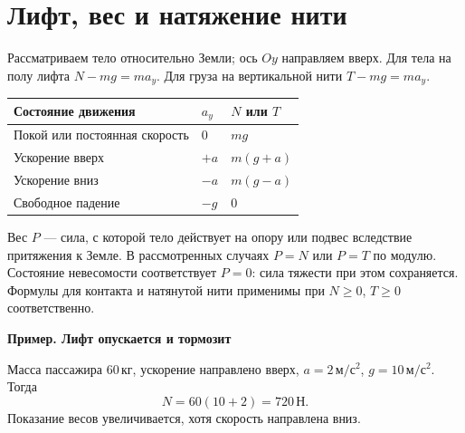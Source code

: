 \documentclass[a4paper,12pt]{article}
\newcommand{\unit}[1]{\,\text{#1}}
\newcommand{\acc}{\unit{м/с$^2$}}
\newcommand{\N}{\unit{Н}}
\newcommand{\kg}{\unit{кг}}
\newcommand{\example}[1]{\par\medskip\textbf{\textcolor{darkaccent}{#1}}\par}
\begin{document}
\section{Лифт, вес и натяжение нити}
Рассматриваем тело относительно Земли; ось $Oy$ направляем вверх. Для тела на полу лифта $N-mg=ma_y$. Для груза на вертикальной нити $T-mg=ma_y$.
\begin{center}
\end{center}
\begin{tabularx}{\linewidth}{@{}Xll@{}}\toprule
Состояние движения & $a_y$ & $N$ или $T$ \\\midrule
Покой или постоянная скорость & $0$ & $mg$\\
Ускорение вверх & $+a$ & $m(g+a)$\\
Ускорение вниз & $-a$ & $m(g-a)$\\
Свободное падение & $-g$ & $0$\\\bottomrule
\end{tabularx}
Вес $P$ --- сила, с которой тело действует на опору или подвес вследствие притяжения к Земле. В рассмотренных случаях $P=N$ или $P=T$ по модулю. Состояние невесомости соответствует $P=0$: сила тяжести при этом сохраняется. Формулы для контакта и натянутой нити применимы при $N\ge0$, $T\ge0$ соответственно.
\example{Пример. Лифт опускается и тормозит}
Масса пассажира $60\kg$, ускорение направлено вверх, $a=2\acc$, $g=10\acc$. Тогда
\[N=60(10+2)=720\N.\]
Показание весов увеличивается, хотя скорость направлена вниз.
\clearpage
\end{document}
